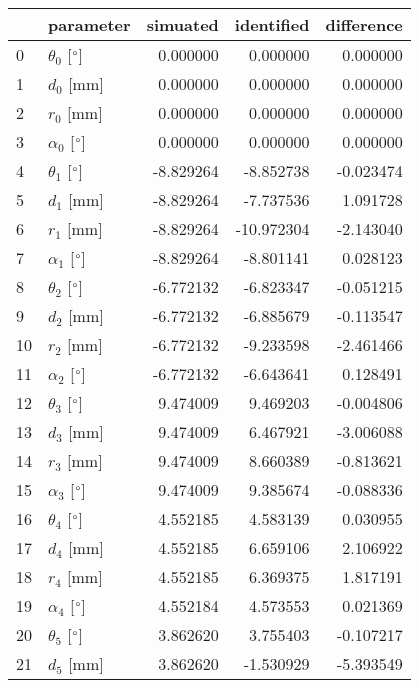 \documentclass{standalone}%
\begin{document}
%
\normalsize%
\begin{tabular}{llrrr}
\toprule
{} &                 parameter &  simuated & identified & difference \\
\midrule
0  &  $\theta_{0}$ [$\degree$] &  0.000000 &   0.000000 &   0.000000 \\
1  &              $d_{0}$ [mm] &  0.000000 &   0.000000 &   0.000000 \\
2  &              $r_{0}$ [mm] &  0.000000 &   0.000000 &   0.000000 \\
3  &  $\alpha_{0}$ [$\degree$] &  0.000000 &   0.000000 &   0.000000 \\
4  &  $\theta_{1}$ [$\degree$] & -8.829264 &  -8.852738 &  -0.023474 \\
5  &              $d_{1}$ [mm] & -8.829264 &  -7.737536 &   1.091728 \\
6  &              $r_{1}$ [mm] & -8.829264 & -10.972304 &  -2.143040 \\
7  &  $\alpha_{1}$ [$\degree$] & -8.829264 &  -8.801141 &   0.028123 \\
8  &  $\theta_{2}$ [$\degree$] & -6.772132 &  -6.823347 &  -0.051215 \\
9  &              $d_{2}$ [mm] & -6.772132 &  -6.885679 &  -0.113547 \\
10 &              $r_{2}$ [mm] & -6.772132 &  -9.233598 &  -2.461466 \\
11 &  $\alpha_{2}$ [$\degree$] & -6.772132 &  -6.643641 &   0.128491 \\
12 &  $\theta_{3}$ [$\degree$] &  9.474009 &   9.469203 &  -0.004806 \\
13 &              $d_{3}$ [mm] &  9.474009 &   6.467921 &  -3.006088 \\
14 &              $r_{3}$ [mm] &  9.474009 &   8.660389 &  -0.813621 \\
15 &  $\alpha_{3}$ [$\degree$] &  9.474009 &   9.385674 &  -0.088336 \\
16 &  $\theta_{4}$ [$\degree$] &  4.552185 &   4.583139 &   0.030955 \\
17 &              $d_{4}$ [mm] &  4.552185 &   6.659106 &   2.106922 \\
18 &              $r_{4}$ [mm] &  4.552185 &   6.369375 &   1.817191 \\
19 &  $\alpha_{4}$ [$\degree$] &  4.552184 &   4.573553 &   0.021369 \\
20 &  $\theta_{5}$ [$\degree$] &  3.862620 &   3.755403 &  -0.107217 \\
21 &              $d_{5}$ [mm] &  3.862620 &  -1.530929 &  -5.393549 \\

\end{tabular}
\end{document}
